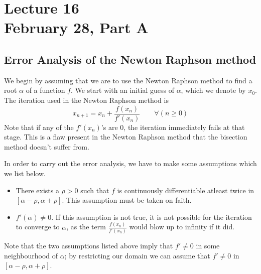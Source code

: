 \chapter*{Lecture 16 \\ February 28, Part A}
\setcounter{chapter}{16}
\setcounter{section}{0}

\section{Error Analysis of the Newton Raphson method}

We begin by assuming that we are to use the Newton Raphson method to find a root $\alpha$ of a function $f$. We start with an initial guess of $\alpha$, which we denote by $x_0$.
The iteration used in the Newton Raphson method is
\begin{equation}
  \label{feb28:def:iter}
  x_{n+1} = x_n + \frac{f(x_n)}{f'(x_n)} \qquad \forall(n \geq 0)
\end{equation}
Note that if any of the $f'(x_n)$'s are 0, the iteration immediately fails at that stage. This is a flaw present in the Newton Raphson method that the bisection method doesn't suffer from.

In order to carry out the error analysis, we have to make some assumptions which we list below.
\begin{itemize}
\item
  There exists a $\rho > 0$ such that $f$ is continuously differentiable atleast twice in $[\alpha - \rho, \alpha + \rho]$. This assumption must be taken on faith.
\item
  $f'(\alpha) \neq 0$. If this assumption is not true, it is not possible for the iteration to converge to $\alpha$, as the term $\frac{f(x_n)}{f'(x_n)}$ would blow up to infinity if it did.
\end{itemize}

Note that the two assumptions listed above imply that $f' \neq 0$ in some neighbourhood of $\alpha$; by restricting our domain we can assume that $f' \neq 0$ in $[\alpha - \rho, \alpha + \rho]$.

